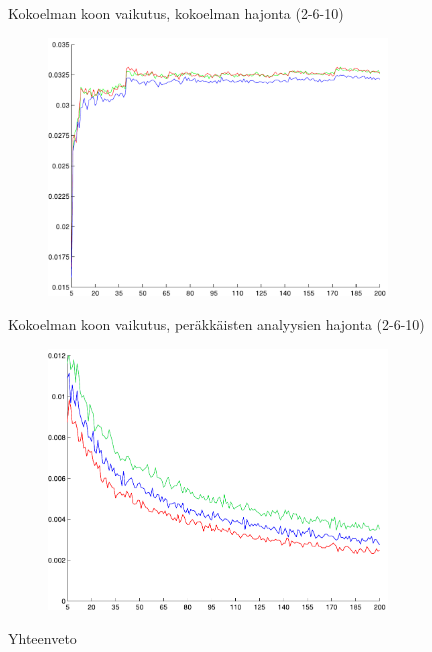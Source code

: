 \documentclass{beamer}
\begin{document}
\begin{frame}{Kokoelman koon vaikutus, kokoelman hajonta (2-6-10)}

\begin{figure}
\includegraphics[width=9cm]{ensemble_stdev.pdf}
\end{figure}

\end{frame}

\begin{frame}{Kokoelman koon vaikutus, peräkkäisten analyysien hajonta (2-6-10)}

\begin{figure}
\includegraphics[width=9cm]{stdev_between_analysis.pdf}
\end{figure}

\end{frame}

\begin{frame}{Yhteenveto}

\end{frame}
\end{document}
